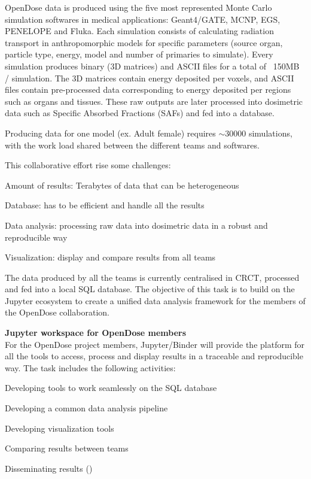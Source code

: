 \begin{task}[title=OpenDose unified data analysis framework,
  id=opendose-analysis,
  lead=INSERM,
  PM=24,
  wphases={0-48},
  partners={}
]
  OpenDose data is produced using the five most represented Monte Carlo simulation softwares in medical applications: Geant4/GATE, MCNP, EGS, PENELOPE and Fluka. Each simulation consists of calculating radiation transport in anthropomorphic models  for specific parameters (source organ, particle type, energy, model and number of primaries to simulate).
  Every simulation produces binary (3D matrices) and ASCII files for a total of ~150MB / simulation. The 3D matrices contain energy deposited per voxels, and ASCII files contain pre-processed data corresponding to energy deposited per regions such as organs and tissues. These raw outputs are later processed into dosimetric data such as Specific Absorbed Fractions (SAFs) and fed into a database.

  Producing data for one model (ex. Adult female) requires $\sim 30 000$ simulations, with the work load shared between the different teams and softwares. 

  This collaborative effort rise some challenges:
  \begin{compactitem}
  \item Amount of results: Terabytes of data that can be heterogeneous
  \item Database: has to be efficient and handle all the results 
  \item Data analysis: processing raw data into dosimetric data in a robust and reproducible way
  \item Visualization: display and compare results from all teams
  \end{compactitem}


  The data produced by all the teams is currently centralised in CRCT, processed and fed into a local SQL database. 
  The objective of this task is to build on the Jupyter ecosystem to create a unified data analysis framework for the members of the OpenDose collaboration.

  \textbf{Jupyter workspace for OpenDose members}\\
  For the OpenDose project members, Jupyter/Binder will provide the platform for all the tools to access, process and display results in a traceable and reproducible way. 
  The task includes the following activities:
  \begin{compactitem}
  \item Developing tools to work seamlessly on the SQL database
  \item Developing a common data analysis pipeline
  \item Developing visualization tools
  \item Comparing results between teams
  \item Disseminating results
    ()
  \end{compactitem}


\end{task}

